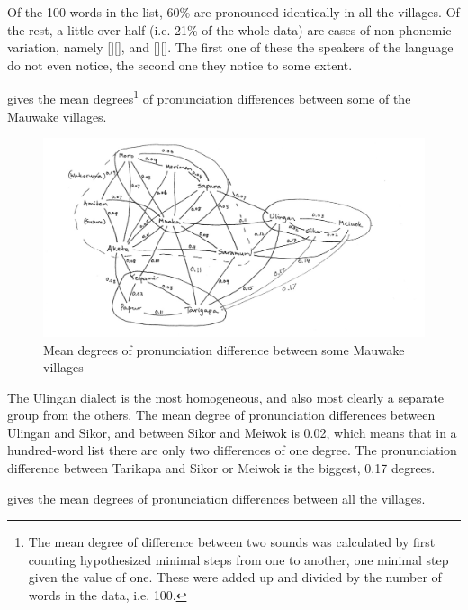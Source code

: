 Of the 100 words in the list, 60\% are pronounced identically in all the villages.  Of the rest, a little over half (i.e. 21\% of the whole data) are cases of non-phonemic variation, namely []{\Tilde}[\emphs{$\beta$}], and []{\Tilde}[\emphs{{\textyogh}}]. The first one of these the speakers of the language do not even notice, the second one they notice to some extent. 

 gives the mean degrees\footnote{The mean degree of difference between two sounds was calculated by first counting hypothesized minimal steps from one to another, one minimal step given the value of one. These were added up and divided by the number of words in the data, i.e. 100.} of pronunciation differences between some of the Mauwake villages. 


\begin{figure}
\caption{Mean degrees of pronunciation difference between some Mauwake villages}
\label{map:5:pronunciationdiff}
\includegraphics[width=\textwidth]{figures/1-mean_degrees_of_pronounciation_difference_between_some_Mauwake_villages_map.jpeg}
\end{figure}

The Ulingan dialect is the most homogeneous, and also most clearly a separate group from the others. The mean degree of pronunciation differences between Ulingan and Sikor, and between Sikor and Meiwok is 0.02, which means that in a hundred-word list there are only two differences of one degree.  The pronunciation difference between Tarikapa and Sikor or Meiwok is the biggest, 0.17 degrees.

 gives the mean degrees of pronunciation differences between all the villages.


